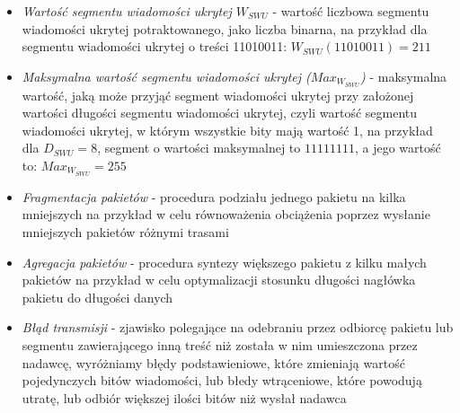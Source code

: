 \documentclass[a4paper, twoside, 12pt]{report}
\begin{document}
\begin{itemize}
        \item \emph{Wartość segmentu wiadomości ukrytej \( W_{SWU} \)} - wartość
            liczbowa segmentu wiadomości ukrytej potraktowanego, jako liczba binarna,
            na przykład dla segmentu wiadomości ukrytej o treści 11010011:
            \( W_{SWU}(11010011) = 211 \)

       \item \emph{Maksymalna wartość segmentu wiadomości ukrytej (\( Max_{W_{SWU}} \))} -
           maksymalna wartość, jaką może przyjąć segment wiadomości ukrytej przy
           założonej wartości długości segmentu wiadomości ukrytej, czyli wartość
           segmentu wiadomości ukrytej, w którym wszystkie bity mają wartość 1,
           na przykład dla \( D_{SWU} = 8 \), segment o wartości maksymalnej to
           \( 11111111 \), a jego wartość to: \( Max_{W_{SWU}} = 255 \)

       \item \emph{Fragmentacja pakietów} - procedura podziału jednego pakietu na
           kilka mniejszych na przykład w celu równoważenia obciążenia poprzez
           wysłanie mniejszych pakietów różnymi trasami

       \item \emph{Agregacja pakietów} - procedura syntezy większego pakietu z
           kilku małych pakietów na przykład w celu optymalizacji stosunku długości
           nagłówka pakietu do długości danych

       \item \emph{Błąd transmisji} - zjawisko polegające na odebraniu przez odbiorcę
           pakietu lub segmentu zawierającego inną treść niż została w nim
           umieszczona przez nadawcę, wyróżniamy błędy podstawieniowe, które
           zmieniają wartość pojedynczych bitów wiadomości, lub błedy wtrąceniowe,
           które powodują utratę, lub odbiór większej ilości bitów niż wysłał nadawca

    \end{itemize}
\end{document}

